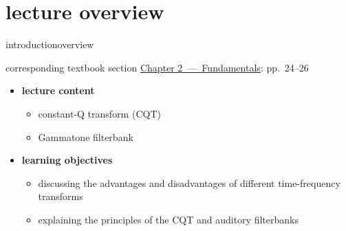 




\subtitle{Module 2.6: Fundamentals~---~Non-Fourier Time-Frequency Transforms}


	

    \section[overview]{lecture overview}
        \begin{frame}{introduction}{overview}
            \begin{block}{corresponding textbook section}
                    \href{http://ieeexplore.ieee.org/xpl/articleDetails.jsp?tp=&arnumber=6331119&}{Chapter 2~---~Fundamentals}: pp.~24--26
            \end{block}

            \begin{itemize}
                \item   \textbf{lecture content}
                    \begin{itemize}
                        \item   constant-Q transform (CQT)
                        \item   Gammatone filterbank
                    \end{itemize}
                \bigskip
                \item<2->   \textbf{learning objectives}
                    \begin{itemize}
                        \item   discussing the advantages and disadvantages of different time-frequency transforms
                        \item   explaining the principles of the CQT and auditory filterbanks
                    \end{itemize}
            \end{itemize}
        \end{frame}
        
